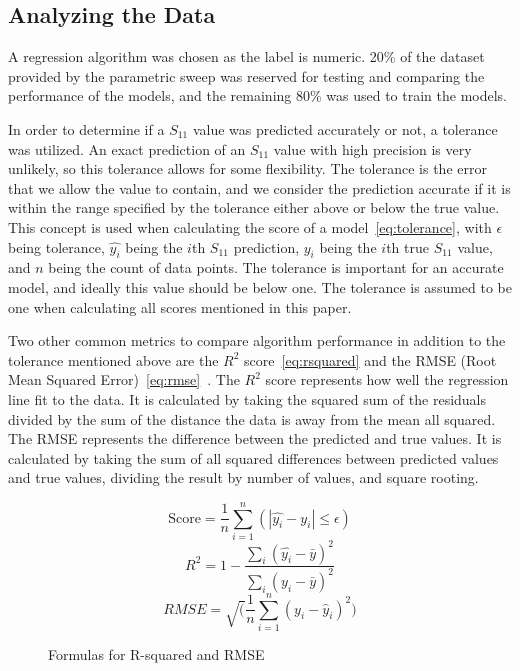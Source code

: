 \documentclass[lettersize,journal]{IEEEtran}
\begin{document}
\subsection{Analyzing the Data}
A regression algorithm was chosen as the label is numeric. 20\% of the dataset provided by the parametric sweep was reserved for testing and comparing the performance of the models, and the remaining 80\% was used to train the models.

In order to determine if a $S_{11}$ value was predicted accurately or not, a tolerance was utilized. An exact prediction of an $S_{11}$ value with high precision is very unlikely, so this tolerance allows for some flexibility. The tolerance is the error that we allow the value to contain, and we consider the prediction accurate if it is within the range specified by the tolerance either above or below the true value. This concept is used when calculating the score of a model~\eqref{eq:tolerance}, with $\epsilon$ being tolerance, $\hat{y_i}$ being the $i$th $S_{11}$ prediction, $y_i$ being the $i$th true $S_{11}$ value, and $n$ being the count of data points. The tolerance is important for an accurate model, and ideally this value should be below one. The tolerance is assumed to be one when calculating all scores mentioned in this paper.

Two other common metrics to compare algorithm performance in addition to the tolerance mentioned above are the $R^2$ score~\eqref{eq:rsquared} and the RMSE (Root Mean Squared Error)~\eqref{eq:rmse}~\cite{haque_machine_2023,m_el-kenawy_optimized_2022}. The $R^2$ score represents how well the regression line fit to the data. It is calculated by taking the squared sum of the residuals divided by the sum of the distance the data is away from the mean all squared. The RMSE represents the difference between the predicted and true values. It is calculated by taking the sum of all squared differences between predicted values and true values, dividing the result by number of values, and square rooting.

\begin{figure}[h]
    \begin{equation}
        \text{Score} = \frac{1}{n} \sum_{i=1}^{n}(\left|\hat{y_i} - y_i\right| \leq \epsilon)
        \label{eq:tolerance}
    \end{equation}
    \begin{equation}
        R^2 = 1 - \frac{\sum_{i}(\hat{y_i} - \bar{y})^2}{\sum_{i}(y_i - \bar{y})^2}
        \label{eq:rsquared}
    \end{equation}
    \begin{equation}
        {RMSE} = \sqrt(\frac{1}{n} \sum_{i=1}^{n}(y_i - \hat{y}_i)^2)
        \label{eq:rmse}
    \end{equation}
    \caption{Formulas for R-squared and RMSE}
\end{figure}
\end{document}
